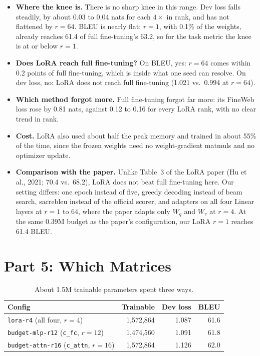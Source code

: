 \documentclass[10pt]{article}
\begin{document}
\begin{itemize}
\item \textbf{Where the knee is.} There is no sharp knee in this range.
  Dev loss falls steadily, by about 0.03 to 0.04 nats for each
  $4\times$ in rank, and has not flattened by $r=64$. BLEU is nearly
  flat: $r=1$, with 0.1\% of the weights, already reaches 61.4 of full
  fine-tuning's 63.2, so for the task metric the knee is at or below
  $r=1$.
\item \textbf{Does LoRA reach full fine-tuning?} On BLEU, yes: $r=64$
  comes within 0.2 points of full fine-tuning, which is inside what one
  seed can resolve. On dev loss, no: LoRA does not reach full
  fine-tuning (1.021 vs.\ 0.994 at $r=64$).
\item \textbf{Which method forgot more.} Full fine-tuning forgot far
  more: its FineWeb loss rose by 0.81 nats, against 0.12 to 0.16 for
  every LoRA rank, with no clear trend in rank.
\item \textbf{Cost.} LoRA also used about half the peak memory and
  trained in about 55\% of the time, since the frozen weights need no
  weight-gradient matmuls and no optimizer update.
\item \textbf{Comparison with the paper.} Unlike Table~3 of the LoRA
  paper (Hu et al., 2021; 70.4 vs.\ 68.2), LoRA does not beat full
  fine-tuning here. Our setting differs: one epoch instead of five,
  greedy decoding instead of beam search, sacrebleu instead of the
  official scorer, and adapters on all four Linear layers at $r=1$ to
  $64$, where the paper adapts only $W_q$ and $W_v$ at $r=4$. At the
  same 0.39M budget as the paper's configuration, our LoRA $r=1$
  reaches 61.4 BLEU.
\end{itemize}
\newpage
\section*{Part 5: Which Matrices}

\begin{table}[htbp]
\caption{About 1.5M trainable parameters spent three ways.}
\label{tab:budget}
\centering
\begin{tabular}{lrrr}
\toprule
Config & Trainable & Dev loss & BLEU \\
\midrule
\texttt{lora-r4} (all four, $r=4$)            & 1{,}572{,}864 & 1.087 & 61.6 \\
\texttt{budget-mlp-r12} (\texttt{c\_fc}, $r=12$)  & 1{,}474{,}560 & 1.091 & 61.8 \\
\texttt{budget-attn-r16} (\texttt{c\_attn}, $r=16$) & 1{,}572{,}864 & 1.126 & 62.0 \\
\bottomrule
\end{tabular}
\end{table}
\end{document}
